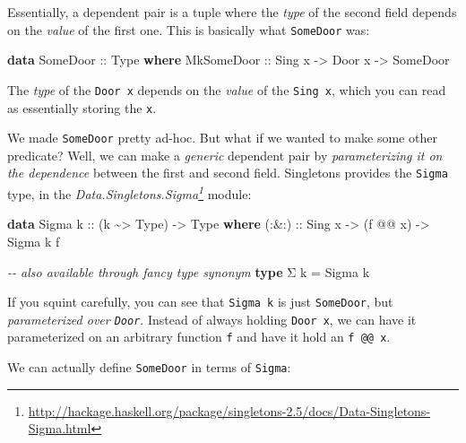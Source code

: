 \documentclass[]{article}
\newenvironment{Shaded}{}{}
\newcommand{\CommentTok}[1]{\textcolor[rgb]{0.38,0.63,0.69}{\textit{#1}}}
\newcommand{\DataTypeTok}[1]{\textcolor[rgb]{0.56,0.13,0.00}{#1}}
\newcommand{\KeywordTok}[1]{\textcolor[rgb]{0.00,0.44,0.13}{\textbf{#1}}}
\newcommand{\NormalTok}[1]{#1}
\newcommand{\OperatorTok}[1]{\textcolor[rgb]{0.40,0.40,0.40}{#1}}
\newcommand{\OtherTok}[1]{\textcolor[rgb]{0.00,0.44,0.13}{#1}}
\renewcommand{\href}[2]{#2\footnote{\url{#1}}}
\begin{document}
Essentially, a dependent pair is a tuple where the \emph{type} of the second
field depends on the \emph{value} of the first one. This is basically what
\texttt{SomeDoor} was:

\begin{Shaded}
\begin{Highlighting}[]
\KeywordTok{data} \DataTypeTok{SomeDoor}\OtherTok{ ::} \DataTypeTok{Type} \KeywordTok{where}
    \DataTypeTok{MkSomeDoor}\OtherTok{ ::} \DataTypeTok{Sing}\NormalTok{ x }\OtherTok{{-}\textgreater{}} \DataTypeTok{Door}\NormalTok{ x }\OtherTok{{-}\textgreater{}} \DataTypeTok{SomeDoor}
\end{Highlighting}
\end{Shaded}

The \emph{type} of the \texttt{Door\ x} depends on the \emph{value} of the
\texttt{Sing\ x}, which you can read as essentially storing the \texttt{x}.

We made \texttt{SomeDoor} pretty ad-hoc. But what if we wanted to make some
other predicate? Well, we can make a \emph{generic} dependent pair by
\emph{parameterizing it on the dependence} between the first and second field.
Singletons provides the \texttt{Sigma} type, in the
\emph{\href{http://hackage.haskell.org/package/singletons-2.5/docs/Data-Singletons-Sigma.html}{Data.Singletons.Sigma}}
module:

\begin{Shaded}
\begin{Highlighting}[]
\KeywordTok{data} \DataTypeTok{Sigma}\OtherTok{ k ::}\NormalTok{ (k }\OperatorTok{\textasciitilde{}\textgreater{}} \DataTypeTok{Type}\NormalTok{) }\OtherTok{{-}\textgreater{}} \DataTypeTok{Type} \KeywordTok{where}
\OtherTok{    (:\&:) ::} \DataTypeTok{Sing}\NormalTok{ x }\OtherTok{{-}\textgreater{}}\NormalTok{ (f }\OperatorTok{@@}\NormalTok{ x) }\OtherTok{{-}\textgreater{}} \DataTypeTok{Sigma}\NormalTok{ k f}

\CommentTok{{-}{-} also available through fancy type synonym}
\KeywordTok{type}\NormalTok{ Σ k }\OtherTok{=} \DataTypeTok{Sigma}\NormalTok{ k}
\end{Highlighting}
\end{Shaded}

If you squint carefully, you can see that \texttt{Sigma\ k} is just
\texttt{SomeDoor}, but \emph{parameterized over \texttt{Door}}. Instead of
always holding \texttt{Door\ x}, we can have it parameterized on an arbitrary
function \texttt{f} and have it hold an \texttt{f\ @@\ x}.

We can actually define \texttt{SomeDoor} in terms of \texttt{Sigma}:
\end{document}
